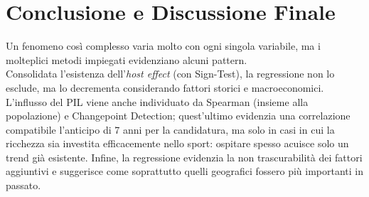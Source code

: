 \section{Conclusione e Discussione Finale}
\label{sec:conclusion}


Un fenomeno così complesso varia molto con ogni singola variabile, ma i
molteplici metodi impiegati evidenziano alcuni pattern.\\
Consolidata l'esistenza dell'\textit{host effect} (con Sign-Test), la regressione
non lo esclude, ma lo decrementa considerando fattori storici e macroeconomici.
L'influsso del PIL viene anche individuato da Spearman (insieme alla
popolazione) e Changepoint Detection; quest'ultimo evidenzia una correlazione
compatibile l'anticipo di 7 anni per la candidatura, ma solo in casi in cui la
ricchezza sia investita efficacemente nello sport: ospitare spesso acuisce solo
un trend già esistente. Infine, la regressione evidenzia la non trascurabilità
dei fattori aggiuntivi e suggerisce come soprattutto quelli geografici fossero
più importanti in passato.